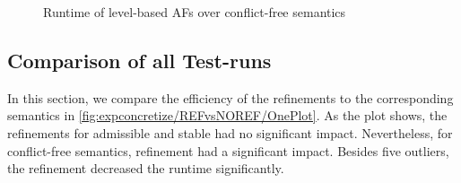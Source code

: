 \begin{figure}[H]
    \centering
    \caption{Runtime of level-based AFs over conflict-free semantics}
    \label{fig:expconcretize/REFvsNOREF/level-based}
\end{figure}


\subsection{Comparison of all Test-runs}
In this section, we compare the efficiency of the refinements to the corresponding semantics in \cref{fig:expconcretize/REFvsNOREF/OnePlot}. As the plot shows, the refinements for admissible and stable had no significant impact. Nevertheless, for conflict-free semantics, refinement had a significant impact. Besides five outliers, the refinement decreased the runtime significantly.

